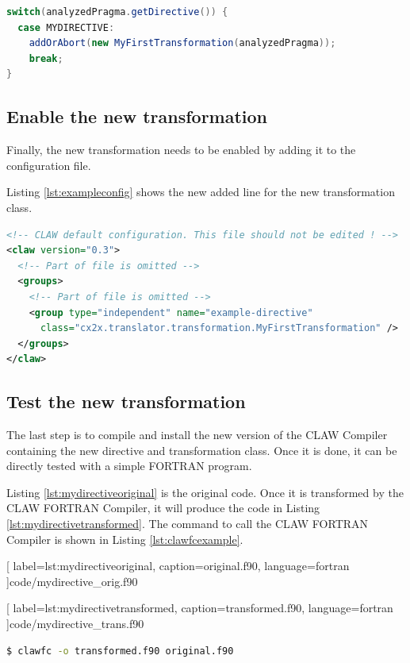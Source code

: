 \documentclass[a4paper, 11pt]{report}
\begin{document}
\begin{lstlisting}[label=lst:categorization, caption=ClawXcodeMlTranslator.java, language=java]
switch(analyzedPragma.getDirective()) {
  case MYDIRECTIVE:
    addOrAbort(new MyFirstTransformation(analyzedPragma));
    break;
}
\end{lstlisting}


\subsection{Enable the new transformation}
Finally, the new transformation needs to be enabled by adding it to the
configuration file.

Listing \ref{lst:exampleconfig} shows the new added line for the new
transformation class.

\begin{lstlisting}[label=lst:exampleconfig, caption=claw-default.xml, language=xml]
<!-- CLAW default configuration. This file should not be edited ! -->
<claw version="0.3">
  <!-- Part of file is omitted -->
  <groups>
    <!-- Part of file is omitted -->
    <group type="independent" name="example-directive"
      class="cx2x.translator.transformation.MyFirstTransformation" />
  </groups>
</claw>
\end{lstlisting}

\subsection{Test the new transformation}
The last step is to compile and install the new version of the CLAW Compiler
containing the new directive and transformation class. Once it is done, it
can be directly tested with a simple FORTRAN program.

Listing \ref{lst:mydirectiveoriginal} is the original code. Once it is
transformed by the CLAW FORTRAN Compiler, it will produce the code
in Listing \ref{lst:mydirectivetransformed}. The command to call
the CLAW FORTRAN Compiler is shown in Listing \ref{lst:clawfcexample}.


  [
    label=lst:mydirectiveoriginal,
    caption=original.f90,
    language=fortran
  ]{code/mydirective_orig.f90}


  [
    label=lst:mydirectivetransformed,
    caption=transformed.f90,
    language=fortran
  ]{code/mydirective_trans.f90}

\begin{lstlisting}[label=lst:clawfcexample, caption=Call the compiler, language=bash]
$ clawfc -o transformed.f90 original.f90
\end{lstlisting}
\end{document}
